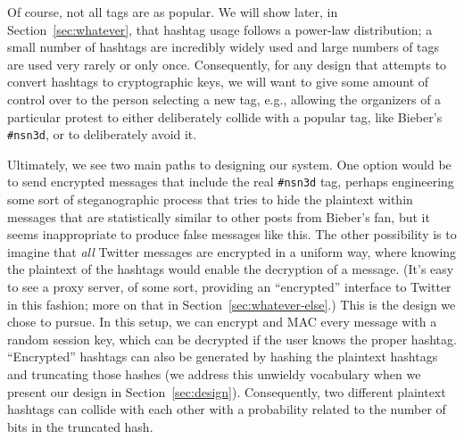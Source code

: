 Of course, not all tags are as popular. We will show later, in Section~\ref{sec:whatever}, that hashtag usage follows a power-law distribution; a small number of hashtags are incredibly widely used and large numbers of tags are used very rarely or only once. Consequently, for any design that attempts to convert hashtags to cryptographic keys, we will want to give some amount of control over to the person selecting a new tag, e.g., allowing the organizers of a particular protest to either deliberately collide with a popular tag, like Bieber's {\tt \#nsn3d}, or to deliberately avoid it.

Ultimately, we see two main paths to designing our system. One option would be to send encrypted messages that include the real {\tt \#nsn3d} tag, perhaps engineering some sort of steganographic process that tries to hide the plaintext within messages that are statistically similar to other posts from Bieber's fan, but it seems inappropriate to produce false messages like this. The other possibility is to imagine that {\em all} Twitter messages are encrypted in a uniform way, where knowing the plaintext of the hashtags would enable the decryption of a message. (It's easy to see a proxy server, of some sort, providing an ``encrypted'' interface to Twitter in this fashion; more on that in Section~\ref{sec:whatever-else}.) This is the design we chose to pursue. In this setup, we can encrypt and MAC every message with a random session key, which can be decrypted if the user knows the proper hashtag. ``Encrypted'' hashtags can also be generated by hashing the plaintext hashtags and truncating those hashes (we address this unwieldy vocabulary when we present our design in Section~\ref{sec:design}). Consequently, two different plaintext hashtags can collide with each other with a probability related to the number of bits in the truncated hash.

